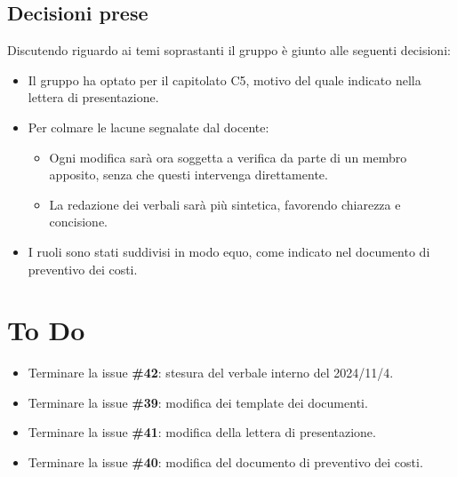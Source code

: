 \documentclass[a4paper, 12pt]{article}
\begin{document}
\subsection{Decisioni prese}
Discutendo riguardo ai temi soprastanti il gruppo è giunto alle seguenti decisioni:
\begin{itemize} 
    \item Il gruppo ha optato per il capitolato C5, motivo del quale indicato nella lettera di presentazione.
    \item Per colmare le lacune segnalate dal docente: 
    \begin{itemize} 
        \item Ogni modifica sarà ora soggetta a verifica da parte di un membro apposito, senza che questi intervenga direttamente.        \item La redazione dei verbali sarà più sintetica, favorendo chiarezza e concisione. 
    \end{itemize} 
    \item I ruoli sono stati suddivisi in modo equo, come indicato nel documento di preventivo dei costi. 
\end{itemize}

\section{To Do}
\begin{itemize}
    \item Terminare la issue \textbf{\#42}: stesura del verbale interno del 2024/11/4.
    \item Terminare la issue \textbf{\#39}: modifica dei template dei documenti.
    \item Terminare la issue \textbf{\#41}: modifica della lettera di presentazione.
    \item Terminare la issue \textbf{\#40}: modifica del documento di preventivo dei costi.
\end{itemize}
\end{document}
